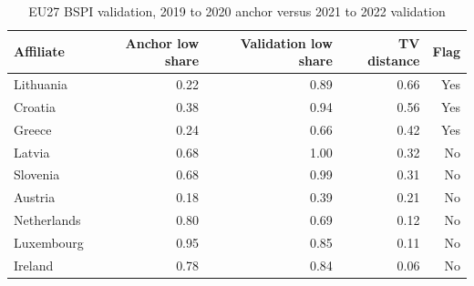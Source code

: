 \begin{table}[H]
\centering
\small
\caption[EU27 BSPI validation]{EU27 BSPI validation, 2019 to 2020 anchor versus 2021 to 2022 validation}
\label{tab:stage1_bspi_updated}
\begin{tabular}{@{}lrrrr@{}}
\toprule
Affiliate & Anchor low share & Validation low share & TV distance & Flag \\
\midrule
Lithuania & 0.22 & 0.89 & 0.66 & Yes \\
Croatia & 0.38 & 0.94 & 0.56 & Yes \\
Greece & 0.24 & 0.66 & 0.42 & Yes \\
Latvia & 0.68 & 1.00 & 0.32 & No \\
Slovenia & 0.68 & 0.99 & 0.31 & No \\
Austria & 0.18 & 0.39 & 0.21 & No \\
Netherlands & 0.80 & 0.69 & 0.12 & No \\
Luxembourg & 0.95 & 0.85 & 0.11 & No \\
Ireland & 0.78 & 0.84 & 0.06 & No \\
\bottomrule
\end{tabular}
\end{table}
